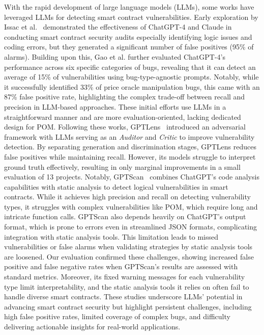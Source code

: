 With the rapid development of large language models (LLMs), some works have leveraged LLMs for detecting smart contract vulnerabilities.
Early exploration by Issac et al.~\cite{david2023you} demonstrated the effectiveness of ChatGPT-4 and Claude in conducting smart contract security audits especially identifying logic issues and coding errors, but they generated a significant number of false positives (95\% of alarms).
Building upon this, Gao et al.\cite{gao2024unveiling} further evaluated ChatGPT-4's performance across six specific categories of bugs, revealing that it can detect an average of 15\% of vulnerabilities using bug-type-agnostic prompts. Notably, while it successfully identified 33\% of price oracle manipulation bugs, this came with an 87\% false positive rate, highlighting the complex trade-off between recall and precision in LLM-based approaches.
These initial efforts use LLMs in a straightforward manner and are more evaluation-oriented, lacking dedicated design for POM.
Following these works, GPTLens~\cite{hu2023large} introduced an adversarial framework with LLMs serving as an \textit{Auditor} and \textit{Critic} to improve vulnerability detection. By separating generation and discrimination stages, GPTLens reduces false positives while maintaining recall. However, its models struggle to interpret ground truth effectively, resulting in only marginal improvements in a small evaluation of 13 projects.
Notably, GPTScan~\cite{sun2023gptscan} combines ChatGPT’s code analysis capabilities with static analysis to detect logical vulnerabilities in smart contracts. While it achieves high precision and recall on detecting vulnerability types, it struggles with complex vulnerabilities like POM, which require long and intricate function calls. GPTScan also depends heavily on ChatGPT's output format, which is prone to errors even in streamlined JSON formats, complicating integration with static analysis tools. This limitation leads to missed vulnerabilities or false alarms when validating strategies by static analysis tools are loosened.
Our evaluation confirmed these challenges, showing increased false positive and false negative rates when GPTScan's results are assessed with standard metrics. Moreover, its fixed warning messages for each vulnerability type limit interpretability, and the static analysis tools it relies on often fail to handle diverse smart contracts.
These studies underscore LLMs’ potential in advancing smart contract security but highlight persistent challenges, including high false positive rates, limited coverage of complex bugs, and difficulty delivering actionable insights for real-world applications.
